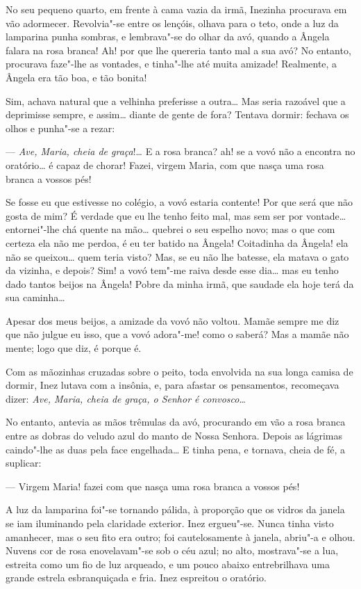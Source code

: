 No seu pequeno quarto, em frente à cama vazia da irmã, Inezinha
procurava em vão adormecer. Revolvia"-se entre os lençóis, olhava para o
teto, onde a luz da lamparina punha sombras, e lembrava"-se do olhar da
avó, quando a Ângela falara na rosa branca! Ah! por que lhe quereria
tanto mal a sua avó? No entanto, procurava faze"-lhe as vontades, e
tinha"-lhe até muita amizade! Realmente, a Ângela era tão boa, e tão
bonita!

Sim, achava natural que a velhinha preferisse a outra\ldots{} Mas seria
razoável que a deprimisse sempre, e assim\ldots{} diante de gente de fora?
Tentava dormir: fechava os olhos e punha"-se a rezar:

--- \emph{Ave, Maria, cheia de graça}!\ldots{} E a rosa branca? ah! se a vovó
não a encontra no oratório\ldots{} é capaz de chorar! Fazei, virgem Maria,
com que nasça uma rosa branca a vossos pés!

Se fosse eu que estivesse no colégio, a vovó estaria contente! Por que
será que não gosta de mim? É verdade que eu lhe tenho feito mal, mas sem
ser por vontade\ldots{} entornei"-lhe chá quente na mão\ldots{} quebrei o seu
espelho novo; mas o que com certeza ela não me perdoa, é eu ter batido
na Ângela! Coitadinha da Ângela! ela não se queixou\ldots{} quem teria visto?
Mas, se eu não lhe batesse, ela matava o gato da vizinha, e depois? Sim!
a vovó tem"-me raiva desde esse dia\ldots{} mas eu tenho dado tantos beijos na
Ângela! Pobre da minha irmã, que saudade ela hoje terá da sua caminha\ldots{}

Apesar dos meus beijos, a amizade da vovó não voltou. Mamãe sempre me
diz que não julgue eu isso, que a vovó adora"-me! como o saberá? Mas a
mamãe não mente; logo que diz, é porque é.

Com as mãozinhas cruzadas sobre o peito, toda envolvida na sua longa
camisa de dormir, Inez lutava com a insônia, e, para afastar os
pensamentos, recomeçava dizer: \emph{Ave, Maria, cheia de graça, o
Senhor é convosco}\ldots{}

No entanto, antevia as mãos trêmulas da avó, procurando em vão a rosa
branca entre as dobras do veludo azul do manto de Nossa Senhora. Depois
as lágrimas caindo"-lhe as duas pela face engelhada\ldots{} E tinha pena, e
tornava, cheia de fé, a suplicar:

--- Virgem Maria! fazei com que nasça uma rosa branca a vossos pés!

A luz da lamparina foi"-se tornando pálida, à proporção que os vidros da
janela se iam iluminando pela claridade exterior. Inez ergueu"-se. Nunca
tinha visto amanhecer, mas o seu fito era outro; foi cautelosamente à
janela, abriu"-a e olhou. Nuvens cor de rosa enovelavam"-se sob o céu
azul; no alto, mostrava"-se a lua, estreita como um fio de luz arqueado,
e um pouco abaixo entrebrilhava uma grande estrela esbranquiçada e fria.
Inez espreitou o oratório.

